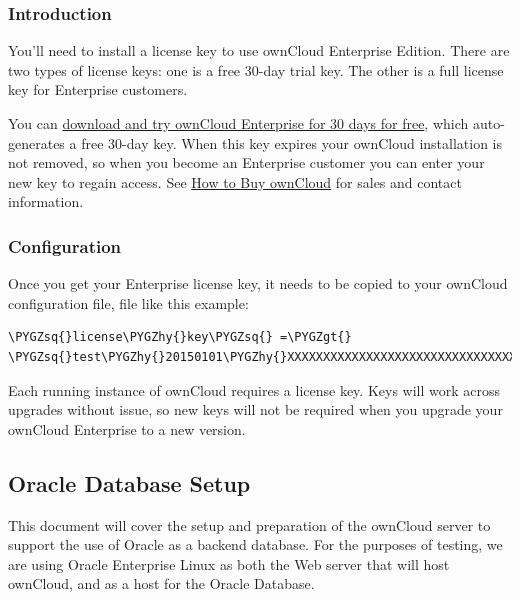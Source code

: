 \documentclass[letterpaper,10pt,english]{sphinxmanual}
\def\PYGZgt{\char`\>}
\def\PYGZhy{\char`\-}
\def\PYGZsq{\char`\'}
\begin{document}
\subsubsection{Introduction}
\label{enterprise_installation/license_keys_installation:introduction}
You'll need to install a license key to use ownCloud Enterprise Edition. There
are two types of license keys: one is a free 30-day trial key. The other is a
full license key for Enterprise customers.

You can \href{https://owncloud.com/download/}{download and try ownCloud Enterprise for 30 days for free}, which auto-generates a free 30-day key. When
this key expires your ownCloud installation is not removed, so when you become
an Enterprise customer you can enter your new key to regain access. See \href{https://owncloud.com/how-to-buy-owncloud/}{How to
Buy ownCloud} for sales and
contact information.


\subsubsection{Configuration}
\label{enterprise_installation/license_keys_installation:configuration}
Once you get your Enterprise license key, it needs to be copied to your
ownCloud configuration file,
 file like this example:

\begin{Verbatim}[commandchars=\\\{\}]
\PYGZsq{}license\PYGZhy{}key\PYGZsq{} =\PYGZgt{} \PYGZsq{}test\PYGZhy{}20150101\PYGZhy{}XXXXXXXXXXXXXXXXXXXXXXXXXXXXXXXXXXXXXXXXXXX\PYGZhy{}YYYYYY’,
\end{Verbatim}

Each running instance of ownCloud requires a license key. Keys will work across
upgrades without issue, so new keys will not be required when you upgrade your
ownCloud Enterprise to a new version.


\subsection{Oracle Database Setup}
\label{enterprise_installation/oracle_db_configuration::doc}\label{enterprise_installation/oracle_db_configuration:oracle-database-setup}
This document will cover the setup and preparation of the ownCloud server to
support the use of Oracle as a backend database.  For the purposes of testing,
we are using Oracle Enterprise Linux as both the Web server that
will host ownCloud, and as a host for the Oracle Database.
\end{document}
